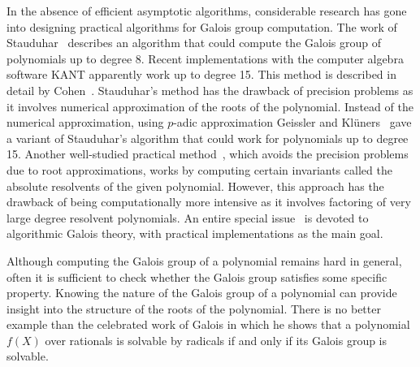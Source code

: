 \documentclass[prodmod,acmtalg]{acmsmall}
\begin{document}
In the absence of efficient asymptotic algorithms, considerable
research has gone into designing practical algorithms for Galois group
computation. The work of Stauduhar~\cite{St73} describes an algorithm
that could compute the Galois group of polynomials up to degree
8. Recent implementations with the computer algebra software KANT
apparently work up to degree 15. This method is described in detail by
Cohen~\cite{Co93}. Stauduhar's method has the drawback of precision
problems as it involves numerical approximation of the roots of the
polynomial. Instead of the numerical approximation, using $p$-adic
approximation Geissler and Kl\"uners~\cite{GK00} gave a variant of
Stauduhar's algorithm that could work for polynomials up to degree
15. Another well-studied practical method~\cite{SM85,MM97}, which
avoids the precision problems due to root approximations, works by
computing certain invariants called the absolute resolvents of the
given polynomial. However, this approach has the drawback of being
computationally more intensive as it involves factoring of very large
degree resolvent polynomials.  An entire special issue~\cite{jsc2000}
is devoted to algorithmic Galois theory, with practical
implementations as the main goal.

Although computing the Galois group of a polynomial remains hard in
general, often it is sufficient to check whether the Galois group
satisfies some specific property. Knowing the nature of the Galois
group of a polynomial can provide insight into the structure of the
roots of the polynomial. There is no better example than the
celebrated work of Galois \cite{galois1830analyse,galois1830note} in
which he shows that a polynomial $f(X)$ over rationals is solvable by
radicals if and only if its Galois group is solvable.
\end{document}
